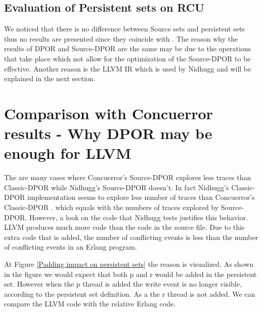 

\subsection{Evaluation of Persistent sets on RCU}
We noticed that there is no difference between Source sets and persistent sets thus no results are presented since they coincide with \cite{Spin}. 
The reason why the results of DPOR and Source-DPOR are the same may be due to the operations that take place which not allow for the optimization of the Source-DPOR 
to be effective. Another reason is the LLVM IR which is used by Nidhugg and will be explained in the next section.

\section{Comparison with Concuerror results - Why DPOR may be enough for LLVM}
The are many cases where Concuerror's Source-DPOR explores less traces than Classic-DPOR while Nidhugg's Source-DPOR doesn't. 
In fact Nidhugg's Classic-DPOR implementation seems to explore less number of traces than Concuerror's Classic-DPOR \cite{AbdullaAronisJohnssonSagonasDPOR2014}.
which equals with the numbers of traces explored by Source-DPOR. However, a look on the code that Nidhugg tests justifies this behavior.
LLVM produces much more code than the code in the source file. Due to this extra code that is added, the number of conflicting events is less than the 
number of conflicting events in an Erlang program.

At Figure \ref{Padding impact on persistent sets} the reason is visualized. As shown in the figure we would expect that both p and r would be added in the persistent set. However when the p thread is added the write event is no longer visible, 
according to the persistent set definition. As a the r thread is not added. We can compare the LLVM code with the relative Erlang code.




